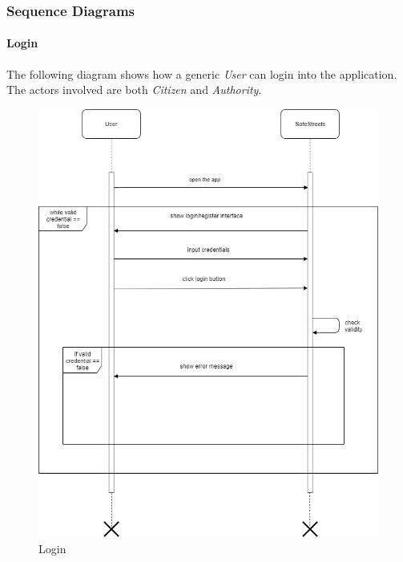 \documentclass{article}
\begin{document}
\clearpage

\subsubsection{Sequence Diagrams}
\paragraph{Login}
The following diagram shows how a generic \textit{User} can login into the application. The actors involved
are both \textit{Citizen} and \textit{Authority}.  
\begin{figure}[H]
    \centering
    \includegraphics[scale=0.5]{img/sequence_diagrams/login.png}
    \caption{Login}
\end{figure}

\clearpage 
\end{document}
